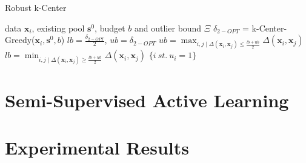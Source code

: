 \documentclass{article}
\begin{document}
\begin{algorithm}[tb]
   \caption{Robust k-Center}
   \label{alg:bin}
\begin{algorithmic}
    data $\mathbf{x}_i$, existing pool $\mathbf{s}^0$, budget $b$ and outlier bound $\Xi$
    $\delta_{2-OPT}$ = k-Center-Greedy($\mathbf{x}_i, \mathbf{s}^0, b$)
   \STATE $lb=\frac{\delta_{2-OPT}}{2}$, $ub=\delta_{2-OPT}$
   \REPEAT
   \STATE $ub=\max_{i,j \mid  \Delta(\mathbf{x}_i,\mathbf{x}_j) \leq \frac{lb+ub}{2}}  \Delta(\mathbf{x}_i,\mathbf{x}_j) $
   \ELSE
   \STATE $lb=\min_{i,j \mid   \Delta(\mathbf{x}_i,\mathbf{x}_j) \geq \frac{lb+ub}{2}}  \Delta(\mathbf{x}_i,\mathbf{x}_j) $
    \ENDIF
       $\{i\ st.\ u_i=1\}$
\end{algorithmic}
\end{algorithm}
\section{Semi-Supervised Active Learning}
\section{Experimental Results}
\end{document}
